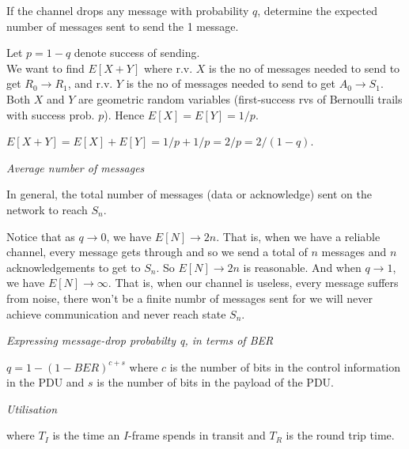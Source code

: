 \frmrule 

\begin{example}
If the channel drops any message with probability $q$, 
determine the expected number of messages sent to send the 1 message.
\end{example}

\frmrule 

Let $p = 1-q$ denote success of sending. \\
We want to find $E[X+Y]$ where r.v. $X$ is the no of messages 
needed to send to get $R_0 \rightarrow R_1$, 
and r.v. $Y$ is the no of messages needed to send to get $A_0 \rightarrow S_1$. 
Both $X$ and $Y$ are geometric random variables 
(first-success rvs of Bernoulli trails with success prob. $p$). 
Hence $E[X] = E[Y] = 1/p$. 

$E[X+Y] = E[X] + E[Y] = 1/p + 1/p = 2/p = 2/(1-q)$.


\frmrule 

\textit{Average number of messages}

In general, the total number of messages (data or acknowledge) 
sent on the network to reach $S_n$.


Notice that as $q \rightarrow 0$, we have $E[N] \rightarrow 2n$. 
That is, when we have a reliable channel, every message gets through 
and so we send a total of $n$ messages and $n$ acknowledgements 
to get to $S_n$. So $E[N] \rightarrow 2n$ is reasonable. 
And when $q \rightarrow 1$, we have $E[N] \rightarrow \infty$. 
That is, when our channel is useless, every message suffers 
from noise, there won't be a finite numbr of messages sent for 
we will never achieve communication and never reach state $S_n$. 


\frmrule 

\textit{Expressing message-drop probabilty q, in terms of BER}

$q = 1-(1-BER)^{c+s}$
where $c$ is the number of bits in the control information in the PDU 
and $s$ is the number of bits in the payload of the PDU. 



\frmrule 

\textit{Utilisation}




where $T_I$ is the time an $I$-frame spends in transit 
and $T_R$ is the round trip time.  

